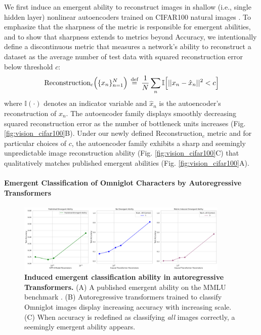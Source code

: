 We first induce an emergent ability to reconstruct images in shallow (i.e., single hidden layer) nonlinear autoencoders trained on CIFAR100 natural images \cite{krizhevsky09learningmultiple}.
To emphasize that the sharpness of the metric is responsible for emergent abilities, and to show that sharpness extends to metrics beyond Accuracy, we intentionally define a discontinuous metric that measures a network's ability to reconstruct a dataset as the average number of test data with squared reconstruction error below threshold $c$:
%
\begin{equation}
    \text{Reconstruction}_c \Big(\{x_n \}_{n=1}^N \Big) \; \operatorname{\stackrel{\text{def}}{=}} \;
    \frac{1}{N} \sum_n \mathbb{I} \Big[ ||x_n - \hat{x}_n||^2 < c \Big]
    \label{eq:reconstruction}
\end{equation}
where $\mathbb{I}(\cdot)$ denotes an indicator variable and $\hat{x}_n$ is the autoencoder's reconstruction of $x_n$.
The autoencoder family displays smoothly decreasing squared reconstruction error as the number of bottleneck units increases (Fig. \ref{fig:vision_cifar100}B). Under our newly defined Reconstruction$_c$ metric and for particular choices of $c$, the autoencoder family exhibits a sharp and seemingly unpredictable image reconstruction ability (Fig. \ref{fig:vision_cifar100}C) that qualitatively matches published emergent abilities (Fig. \ref{fig:vision_cifar100}A).

\paragraph{Emergent Classification of Omniglot Characters by Autoregressive Transformers}

\begin{figure}
    \centering
    \includegraphics[width=0.9\textwidth]{figures/vision/no_emergence_and_emergence_dataset=omniglot.pdf}
    \caption{\textbf{Induced emergent classification ability in autoregressive Transformers.} (A) A published emergent ability on the MMLU benchmark \cite{ganguli2022predictability}. (B) Autoregressive transformers trained to classify Omniglot images display increasing accuracy with increasing scale. (C) When accuracy is redefined as classifying \textit{all} images correctly, a seemingly emergent ability appears.}
    \label{fig:vision_omniglot}
\end{figure}

